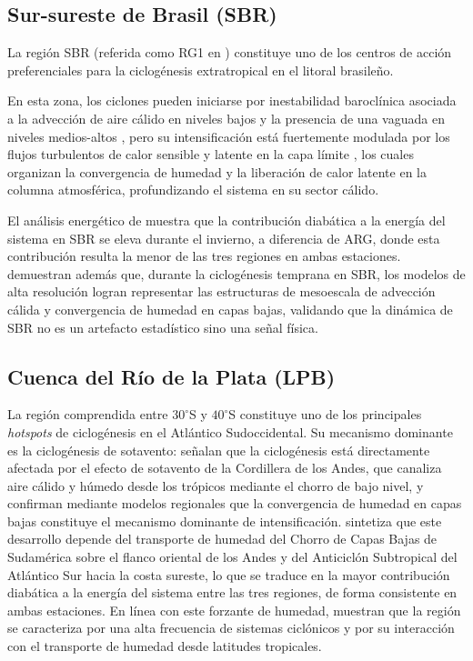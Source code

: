 \subsection{Sur-sureste de Brasil (SBR)}\label{subsec:tb_sbr}

La región SBR (referida como RG1 en \citet{reboita2022from}) constituye uno de los centros de acción preferenciales para la ciclogénesis extratropical en el litoral brasileño. 

En esta zona, los ciclones pueden iniciarse por inestabilidad baroclínica asociada a la advección de aire cálido en niveles bajos y la presencia de una vaguada en niveles medios-altos \citep{gozzo2014subtropical}, pero su intensificación está fuertemente modulada por los flujos turbulentos de calor sensible y latente en la capa límite \citep{gozzo2013air}, los cuales organizan la convergencia de humedad y la liberación de calor latente en la columna atmosférica, profundizando el sistema en su sector cálido. %

El análisis energético de \citet{coutodesouza2024thesis} muestra que la contribución diabática a la energía del sistema en SBR se eleva durante el invierno, a diferencia de ARG, donde esta contribución resulta la menor de las tres regiones en ambas estaciones.\citet{gramcianinov2024early} demuestran además que, durante la ciclogénesis temprana en SBR, los modelos de alta resolución 
logran representar las estructuras de mesoescala de advección cálida y convergencia de humedad en capas bajas, validando que la dinámica de SBR no es un artefacto estadístico sino una señal física.

\subsection{Cuenca del Río de la Plata (LPB)}\label{subsec:tb_lpb}

La región comprendida entre $30^\circ$S y $40^\circ$S constituye uno de los principales \textit{hotspots} de ciclogénesis en el Atlántico Sudoccidental. 
Su mecanismo dominante es la ciclogénesis de sotavento: \citet{gramcianinov2024early} señalan que la ciclogénesis está directamente afectada por el efecto de sotavento de la Cordillera de los Andes, que canaliza aire cálido y húmedo desde los trópicos mediante el chorro de bajo nivel, y confirman mediante modelos regionales que la convergencia de humedad en capas bajas constituye el mecanismo dominante de intensificación.
\citet{coutodesouza2024thesis} sintetiza que este desarrollo depende del transporte de humedad del Chorro de Capas Bajas de Sudamérica sobre el flanco oriental de los Andes y del Anticiclón Subtropical del Atlántico Sur hacia la costa sureste, lo que se traduce en la mayor contribución diabática a la energía del sistema entre las tres regiones, de forma consistente en ambas estaciones. En línea con este forzante de humedad, \citet{reboita2010south} muestran que la región se caracteriza por una alta frecuencia de sistemas ciclónicos y por su interacción con el transporte de humedad desde latitudes tropicales.

